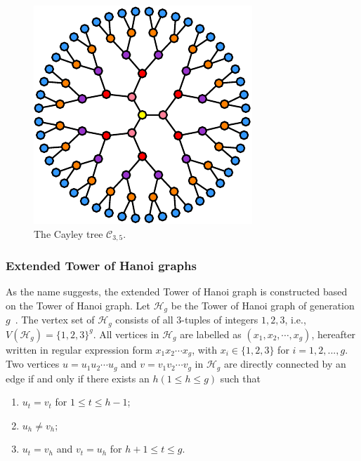 \documentclass[10pt,journal,compsoc,twocolumn,twoside]{IEEEtran}
\begin{document}
\begin{figure}[!t]
    \centering
    \includegraphics[width=0.6\linewidth,trim=0 0 0 0]{Cayley.pdf}
    \caption{The Cayley tree \(\mathcal{C}_{3,5}\).}
    \label{Cayley}
\end{figure}

\subsubsection{Extended Tower of Hanoi graphs}

As the name suggests, the extended Tower of Hanoi graph is constructed  based on the Tower of Hanoi graph.  Let \(\mathcal{H}_{g}\)  be the  Tower of Hanoi graph of generation \(g\)~\cite{HiKlMiPeSt13}. The vertex set of \(\mathcal{H}_{g}\) consists of all \(3\)-tuples of integers \(1,2,3\), i.e., \(V(\mathcal{H}_{g})=\{1,2,3\}^g\). All vertices in \(\mathcal{H}_{g}\) are labelled as \((x_1,x_2,\cdots,x_g)\), hereafter written in regular expression form \(x_1x_2\cdots x_g\), with \(x_i\in\{1,2,3\}\) for \(i=1,2,...,g\). Two vertices \(u=u_1u_2\cdots u_g\) and \(v=v_1v_2\cdots v_g\) in \(\mathcal{H}_{g}\) are directly connected by an edge if and only if there exists an \(h(1\le h\le g)\) such that
\begin{enumerate}
    \item \(u_t=v_t\) for \(1\le t\le h-1\);
    \item \(u_h\neq v_h\);
    \item \(u_t=v_h\) and \(v_t=u_h\) for \(h+1\le t\le g\).
\end{enumerate}
\end{document}

